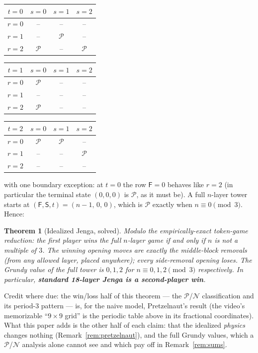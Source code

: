 \documentclass[11pt]{article}
\newtheorem{theorem}{Theorem}
\theoremstyle{definition}
\theoremstyle{remark}
\newcommand{\Fq}{\mathsf{F}}
\newcommand{\Sq}{\mathsf{S}}
\begin{document}
\begin{center}
\begin{tabular}{c|ccc}
$t=0$ & $s=0$ & $s=1$ & $s=2$ \\
\midrule
$r=0$ & -- & -- & -- \\
$r=1$ & -- & $\mathcal{P}$ & -- \\
$r=2$ & $\mathcal{P}$ & -- & $\mathcal{P}$ \\
\end{tabular}
\qquad
\begin{tabular}{c|ccc}
$t=1$ & $s=0$ & $s=1$ & $s=2$ \\
\midrule
$r=0$ & $\mathcal{P}$ & -- & -- \\
$r=1$ & -- & -- & -- \\
$r=2$ & $\mathcal{P}$ & -- & -- \\
\end{tabular}
\qquad
\begin{tabular}{c|ccc}
$t=2$ & $s=0$ & $s=1$ & $s=2$ \\
\midrule
$r=0$ & $\mathcal{P}$ & $\mathcal{P}$ & -- \\
$r=1$ & -- & -- & $\mathcal{P}$ \\
$r=2$ & -- & -- & -- \\
\end{tabular}
\end{center}

\noindent with one boundary exception: at $t=0$ the row $\Fq = 0$ behaves
like $r=2$ (in particular the terminal state $(0,0,0)$ is $\mathcal{P}$, as
it must be). A full $n$-layer tower starts at $(\Fq,\Sq,t) = (n-1,\,0,\,0)$,
which is $\mathcal{P}$ exactly when $n \equiv 0 \pmod 3$. Hence:

\begin{theorem}[Idealized Jenga, solved]\label{thm:main}
Modulo the empirically-exact token-game reduction: the first player wins
the full $n$-layer game if and only if $n$ is \emph{not} a multiple of $3$.
The winning opening moves are exactly the middle-block removals (from any
allowed layer, placed anywhere); every side-removal opening loses. The
Grundy value of the full tower is $0, 1, 2$ for
$n \equiv 0, 1, 2 \pmod 3$ respectively.
In particular, \textbf{standard 18-layer Jenga is a second-player win}.
\end{theorem}

Credit where due: the win/loss half of this theorem --- the
$\mathcal{P}$/$\mathcal{N}$ classification and its period-3 pattern --- is,
for the naive model, Pretzelnaut's result (the video's memorizable
``$9\times9$ grid'' is the periodic table above in its fractional
coordinates). What this paper adds is the other half of each claim: that
the idealized \emph{physics} changes nothing (Remark~\ref{rem:pretzelnaut}),
and the full Grundy values, which a $\mathcal{P}$/$\mathcal{N}$ analysis
alone cannot see and which pay off in Remark~\ref{rem:sums}.
\end{document}
